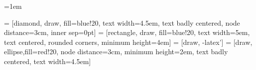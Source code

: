 \usepackage[utf8]{inputenc}
\usepackage[danish, latin, english]{babel}

\usepackage[a4paper,width=150mm,headheight=110pt,top=30mm,bottom=30mm,includefoot]{geometry}
\linespread{1.3} %
\setlength{\parskip}{1em}   %
\setlength{\parindent}{0pt} %
\usepackage{fancyhdr}
\pagestyle{fancy}
\lhead{}
\chead{}
\makeatletter
\rhead{\slshape{\nouppercase{\rightmark}}}
\makeatother
\usepackage{setspace}
\usepackage{wrapfig}
\usepackage{caption}
\usepackage{subcaption}
\usepackage[bottom]{footmisc}   %
\emergencystretch=1em
\usepackage{scrextend}
\addto{\captionsenglish}{\renewcommand{\abstractname}{Abstract}}
\usepackage{pdfpages}
\usepackage{needspace} 
\usepackage{tocloft}  %
\setcounter{secnumdepth}{2} %
\setcounter{tocdepth}{2} %


\usepackage{float}                  
\usepackage{amsmath}
\usepackage{amssymb} 
\usepackage{gensymb}
\usepackage{mathtools}
\usepackage{esvect} %

\usepackage{enumerate}
\usepackage{enumitem}
\usepackage{multirow} %
\usepackage{multicol}    %
\usepackage{enumitem}
\usepackage{ltablex}
\usepackage{spreadtab}
\usepackage{booktabs}%
\newcommand{\tabitem}{~~\llap{\textbullet}~~}

\usepackage{algorithm}                      %
\usepackage[noend]{algpseudocode}           %
\usepackage{listings}
\renewcommand{\arraystretch}{1.2}
\renewcommand{\tabcolsep}{0.2cm}


\usepackage[backend=biber, sorting=none,block=ragged,citestyle=authoryear]{biblatex}

\usepackage{csquotes}
\usepackage{hyperref}

 
\usepackage{pgfplots}  %
\usepackage{graphicx}
\usetikzlibrary{shapes,arrows}
\usepackage{tikz}
\usetikzlibrary{shapes,arrows}
 = [diamond, draw, fill=blue!20, 
    text width=4.5em, text badly centered, node distance=3cm, inner sep=0pt]
 = [rectangle, draw, fill=blue!20, 
    text width=5em, text centered, rounded corners, minimum height=4em]
 = [draw, -latex']
 = [draw, ellipse,fill=red!20, node distance=3cm,
    minimum height=2em, text badly centered, text width=4.5em]
\usepackage{siunitx}
\usepackage[siunitx]{circuitikz}    

